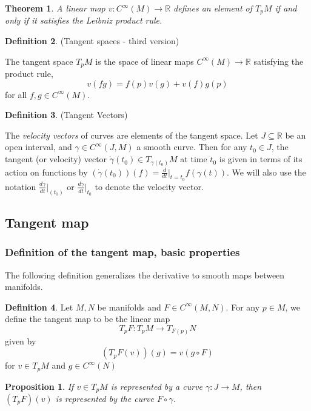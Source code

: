 \documentclass{article}
\newtheorem{theorem}{Theorem}[section]
\newtheorem{proposition}{Proposition}[theorem]
\theoremstyle{definition}
\newtheorem{defn}[theorem]{Definition}
\newenvironment{definition}
  {\vspace{8pt}\begin{mdframed}[backgroundcolor=blueish,innertopmargin=4]\begin{defn}}
  {\end{defn}\end{mdframed}\vspace{4pt}}
\begin{document}
\begin{theorem}

A linear map $v : C^\infty(M) \rightarrow \mathbb R$ defines an element of $T_pM$ if and only if it satisfies the Leibniz product rule.
\end{theorem}

\begin{definition} (Tangent spaces - third version)

The tangent space $T_pM$ is the space of linear maps $C^\infty(M) \rightarrow \mathbb R$ satisfying the product rule, 
\[
    v(f g) = f(p)v(g) +v(f)g(p)
\]
for all $f,g \in C^\infty(M)$.
\end{definition}

\begin{definition} (Tangent Vectors)

The \textit{velocity vectors} of curves are elements of the tangent space. Let $J \subseteq \mathbb R$ be an open interval, and $\gamma \in C^\infty(J,M)$ a smooth curve. Then for any $t_0 \in J$, the tangent (or velocity) vector $\dot{\gamma}(t_0) \in T_{\gamma(t_0)}M$ at time $t_0$ is given in terms of its action on functions by $(\dot{\gamma}(t_0))(f) = \frac{d}{dt} \Bigr |_{t=t_0} f(\gamma(t))$. We will also use the notation $\frac{d\gamma}{dt} \Bigr|_(t_0)$ or $\frac{d\gamma}{dt} \Bigr |_{t_0}$ to denote the velocity vector.
\end{definition}

\subsection{Tangent map}
\subsubsection{Definition of the tangent map, basic properties}

The following definition generalizes the derivative to smooth maps between manifolds.

\begin{definition}

Let $M,N$ be manifolds and $F \in C^\infty(M,N)$. For any $p \in M$, we define the tangent map to be the linear map 
\[
    T_pF : T_pM \rightarrow T_{F(p)}N
\]
given by 
\[
    (T_{p}F(v))(g) = v(g \circ F) 
\]
for $v \in T_pM$ and $g \in C^\infty(N)$

\end{definition}

\begin{proposition}
If $v \in T_p M$ is represented by a curve $\gamma : J \rightarrow M$, then $(T_pF)(v)$ is represented by the curve $F\circ \gamma$.
\end{proposition}
\end{document}
